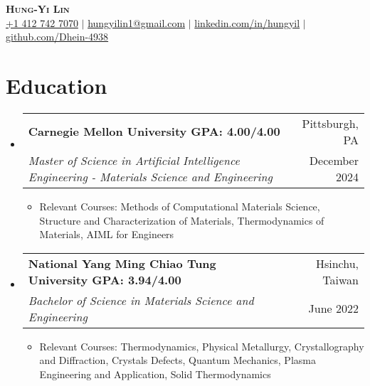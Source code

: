 \documentclass[a4paper,11pt]{article}
\makeatletter
\newcommand{\resumeItem}[1]{
  \item\small{
    {#1 \vspace{-2pt}}
  }
}
\newcommand{\resumeDoubleHeading}[4]{
  \vspace{-2pt}\item
    \begin{tabular*}{0.97\textwidth}[t]{l@{\extracolsep{\fill}}r}
        \textbf{#1} & #2 \\
        \textit{\small#3} & {\small #4} \\
    \end{tabular*}\vspace{-6pt}
}
\newcommand{\resumeSubHeadingListStart}{\begin{itemize}[leftmargin=0.15in, label={}]}
\newcommand{\resumeSubHeadingListEnd}{\end{itemize}}
\makeatother
\begin{document}

\begin{center}
    \textbf{\Huge \scshape Hung-Yi Lin} \\ \vspace{3pt}
    \small
    \faMobile \hspace{.5pt} \href{tel:14127427070}{+1 412 742 7070}
    $|$
    \faAt \hspace{.5pt} \href{mailto:hungyilin1@gmail.com}{hungyilin1@gmail.com}
    $|$
    \faLinkedinSquare \hspace{.5pt} \href{https://www.linkedin.com/in/hungyil}{linkedin.com/in/hungyil}
    $|$
    \faGithub \hspace{.5pt} \href{https://github.com/Dhein-4938}{github.com/Dhein-4938}
\end{center}



\section{Education}
\resumeSubHeadingListStart
    \resumeDoubleHeading
      {Carnegie Mellon University \textnormal{\small GPA: 4.00/4.00}}{Pittsburgh, PA}
      {Master of Science in Artificial Intelligence Engineering - Materials Science and Engineering}{December 2024}
    \resumeSubHeadingListStart
        \resumeItem{Relevant Courses: Methods of Computational Materials Science, Structure and Characterization of Materials, Thermodynamics of Materials, AIML for Engineers}
    \resumeSubHeadingListEnd
    \resumeDoubleHeading
      {National Yang Ming Chiao Tung University  \textnormal{\small GPA: 3.94/4.00}}{Hsinchu, Taiwan}
      {Bachelor of Science in Materials Science and Engineering}{June 2022}
    \resumeSubHeadingListStart
        \resumeItem{Relevant Courses: Thermodynamics, Physical Metallurgy, Crystallography and Diffraction, Crystals Defects, Quantum Mechanics, Plasma Engineering and Application, Solid Thermodynamics }
    \resumeSubHeadingListEnd   
\resumeSubHeadingListEnd

\end{document}
